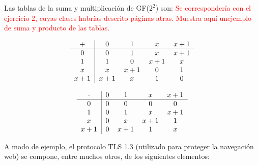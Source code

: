 \item Las tablas de la suma y multiplicación de GF($2^2$) son:
    \warning\textcolor{red}{Se correspondería con el ejercicio 2, cuyas clases habrías descrito páginas atras. Muestra aquí unejemplo de suma y producto de las tablas.}
    \vspace{-2em}
    \begin{center}
        \begin{minipage}[t]{0.45\textwidth}
           \[
            \begin{tabular}{c|cccc}
            $+$ & $0$ & $1$ & $x$ & $x+1$ \\ \hline
            $0$ & $0$ & $1$ & $x$ & $x+1$ \\
            $1$ & $1$ & $0$ & $x+1$ & $x$ \\
            $x$ & $x$ & $x+1$ & $0$ & $1$ \\
            $x+1$ & $x+1$ & $x$ & $1$ & $0$ \\
            \end{tabular}
            \]
        \end{minipage}
    \hspace{1em}
        \begin{minipage}[t]{0.4\textwidth}
            \[
                \begin{tabular}{c|cccc}
            $\cdot$ & $0$ & $1$ & $x$ & $x+1$ \\ \hline
            $0$ & $0$ & $0$ & $0$ & $0$ \\
            $1$ & $0$ & $1$ & $x$ & $x+1$ \\
            $x$ & $0$ & $x$ & $x+1$ & $1$ \\
            $x+1$ & $0$ & $x+1$ & $1$ & $x$ \\
            \end{tabular}
            \]
        \end{minipage}
    \end{center}

    A modo de ejemplo, el protocolo TLS 1.3 (utilizado para proteger la navegación web) se compone, entre muchos otros, de los siguientes elementos:

